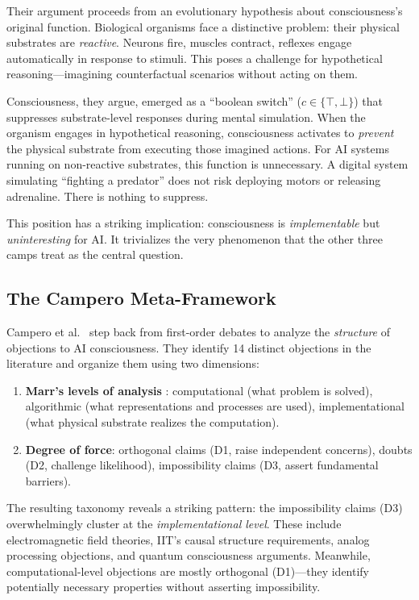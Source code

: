 Their argument proceeds from an evolutionary hypothesis about consciousness's original
function. Biological organisms face a distinctive problem: their physical substrates are
\emph{reactive}. Neurons fire, muscles contract, reflexes engage automatically in response
to stimuli. This poses a challenge for hypothetical reasoning---imagining counterfactual
scenarios without acting on them.

Consciousness, they argue, emerged as a ``boolean switch'' ($c \in \{\top, \bot\}$) that
suppresses substrate-level responses during mental simulation. When the organism engages in
hypothetical reasoning, consciousness activates to \emph{prevent} the physical substrate
from executing those imagined actions. For AI systems running on non-reactive substrates,
this function is unnecessary. A digital system simulating ``fighting a predator'' does not
risk deploying motors or releasing adrenaline. There is nothing to suppress.

This position has a striking implication: consciousness is \emph{implementable} but
\emph{uninteresting} for AI. It trivializes the very phenomenon that the other three camps
treat as the central question.

\subsection{The Campero Meta-Framework}

Campero et al.\ \cite{campero2025taxonomy} step back from first-order debates to analyze
the \emph{structure} of objections to AI consciousness. They identify 14 distinct objections
in the literature and organize them using two dimensions:

\begin{enumerate}[leftmargin=2em]
\item \textbf{Marr's levels of analysis} \cite{marr1982vision}: computational (what problem
      is solved), algorithmic (what representations and processes are used), implementational
      (what physical substrate realizes the computation).
\item \textbf{Degree of force}: orthogonal claims (D1, raise independent concerns), doubts
      (D2, challenge likelihood), impossibility claims (D3, assert fundamental barriers).
\end{enumerate}

The resulting taxonomy reveals a striking pattern: the impossibility claims (D3)
overwhelmingly cluster at the \emph{implementational level}. These include electromagnetic
field theories, IIT's causal structure requirements, analog processing objections, and
quantum consciousness arguments. Meanwhile, computational-level objections are mostly
orthogonal (D1)---they identify potentially necessary properties without asserting
impossibility.

